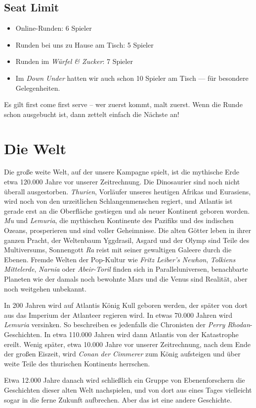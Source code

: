 \documentclass[11pt]{wbzine}
\begin{document}
\begin{multicols}{2}
\subsection{Seat Limit}

\begin{itemize}
    \item Online-Runden: 6 Spieler
    \item Runden bei uns zu Hause am Tisch: 5 Spieler
    \item Runden im \textit{Würfel \& Zucker}: 7 Spieler
    \item Im \textit{Down Under} hatten wir auch schon 10 Spieler am
	Tisch --- für besondere Gelegenheiten.
\end{itemize}

Es gilt first come first serve – wer zuerst kommt, malt zuerst. Wenn die Runde
schon ausgebucht ist, dann zettelt einfach die Nächste an!


\section{Die Welt}

Die große weite Welt, auf der unsere Kampagne spielt, ist die
mythische Erde etwa 120.000 Jahre vor unserer Zeitrechnung. Die
Dinosaurier sind noch nicht überall ausgestorben. \textit{Thurien},
Vorläufer unseres heutigen Afrikas und Eurasiens, wird noch von den
urzeitlichen Schlangenmenschen regiert, und Atlantis ist gerade erst
an die Oberfläche gestiegen und als neuer Kontinent geboren worden.
\textit{Mu} und \textit{Lemuria}, die mythischen Kontinente des
Pazifiks und des indischen Ozeans, prosperieren und sind voller
Geheimnisse. Die alten Götter leben in ihrer ganzen Pracht, der
Weltenbaum Yggdrasil, Asgard und der Olymp sind Teile des Multiversums,
Sonnengott \textit{Ra} reist mit seiner gewaltigen Galeere durch die
Ebenen. Fremde Welten der Pop-Kultur wie \textit{Fritz Leiber's
Newhon}, \textit{Tolkiens Mittelerde}, \textit{Narnia} oder
\textit{Abeir-Toril} finden sich in Paralleluniversen, benachbarte Planeten
wie der damals noch bewohnte Mars und die Venus sind Realität, aber noch weitgehen
unbekannt.

In 200 Jahren wird auf Atlantis König Kull geboren werden, der
später von dort aus das Imperium der Atlanteer regieren wird. In
etwas 70.000 Jahren wird \textit{Lemuria} versinken. So beschreiben es
jedenfalls die Chronisten der \textit{Perry Rhodan}-Geschichten. 
In etwa 110.000 Jahren wird dann Atlantis von der Katastrophe
ereilt. Wenig später, etwa 10.000 Jahre vor unserer Zeitrechnung,
nach dem Ende der großen Eiszeit, wird \textit{Conan der Cimmerer}
zum König aufsteigen und über weite Teile des thurischen Kontinents
herrschen. 

Etwa 12.000 Jahre danach wird schließlich ein Gruppe von
Ebenenforschern die Geschichten dieser alten Welt nachspielen, und
von dort aus eines Tages vielleicht sogar in die ferne Zukunft
aufbrechen. Aber das ist eine andere Geschichte.




\end{multicols}
\end{document}
